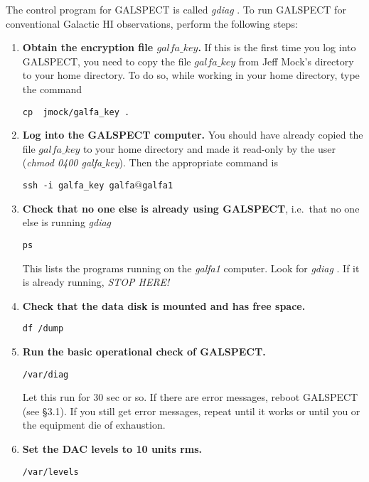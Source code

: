 \documentclass[psfig,preprint]{aastex}
\begin{document}
	The control program for GALSPECT is called {\it gdiag} . To run
GALSPECT for conventional Galactic HI observations, perform the following
steps: \begin{enumerate}

	\item {\bf Obtain the encryption file $galfa\_key$.} 
If this is the first
time you log into GALSPECT, you need to copy the file $galfa\_key$ 
from Jeff Mock's directory to your home directory. 
To do so, while working in your home directory, type the command

\vspace{.1in}
{\centerline{\tt cp ~jmock/galfa\_key .}}

	\item {\bf Log into the GALSPECT computer.} You should have
already copied the file $galfa\_key$ to your home directory
and made it read-only by the user ({\it chmod 0400 galfa$\_$key}). Then
the appropriate command is

\vspace{.1in}
{\centerline{\tt ssh -i galfa\_key galfa$@$galfa1 }}

	\item {\bf Check that no one else is already using GALSPECT},
i.e.\ that no one else is running {\it gdiag}

\vspace{.1in}
{\centerline{\tt  ps}}

\noindent This lists the programs running on the {\it galfa1}
computer. Look for {\it gdiag} . If it is already running, {\it STOP
HERE!} 

	\item {\bf Check that the data disk is mounted and has free space.}

\vspace{.1in}
{\centerline{\tt  df /dump  }}

	\item {\bf Run the basic operational check of GALSPECT.}

\vspace{.1in}
{\centerline{\tt  /var/diag}}

	Let this run for 30 sec or so.  If there are error messages,
reboot GALSPECT (see \S 3.1).  If you still get error
messages, repeat until it works or until you or the equipment 
die of exhaustion. 

	\item {\bf Set the DAC levels to 10 units rms.}

\vspace{.1in}
{\centerline{\tt  /var/levels}}



\end{enumerate}
\end{document}

